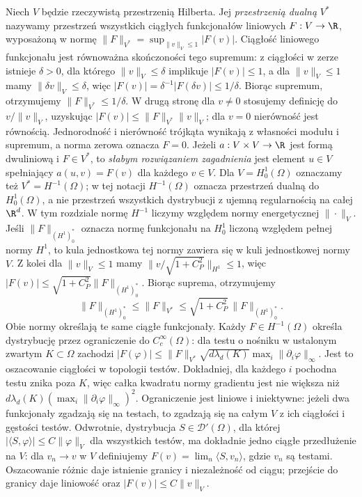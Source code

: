 \begin{definicja}
\label{def:pde11-dual}
Niech $V$ będzie rzeczywistą przestrzenią Hilberta.
Jej \emph{przestrzenią dualną} $V^*$ nazywamy przestrzeń wszystkich
ciągłych funkcjonałów liniowych $F:V\to\R$, wyposażoną w normę
$\|F\|_{V^*}=\sup_{\|v\|_V\le1}|F(v)|$.
Ciągłość liniowego funkcjonału jest równoważna skończoności
tego supremum: z ciągłości w zerze istnieje $\delta>0$,
dla którego $\|v\|_V\le\delta$ implikuje $|F(v)|\le1$,
a dla $\|v\|_V\le1$ mamy $\|\delta v\|_V\le\delta$,
więc $|F(v)|=\delta^{-1}|F(\delta v)|\le1/\delta$.
Biorąc supremum, otrzymujemy $\|F\|_{V^*}\le1/\delta$.
W drugą stronę dla $v\ne0$ stosujemy definicję do
$v/\|v\|_V$, uzyskując $|F(v)|\le\|F\|_{V^*}\|v\|_V$;
dla $v=0$ nierówność jest równością.
Jednorodność i nierówność trójkąta wynikają z własności
modułu i supremum, a norma zerowa oznacza $F=0$.
Jeżeli $a:V\times V\to\R$ jest formą dwuliniową i $F\in V^*$,
to \emph{słabym rozwiązaniem zagadnienia} jest element $u\in V$
spełniający $a(u,v)=F(v)$ dla każdego $v\in V$.
Dla $V=H_0^1(\Omega)$ oznaczamy też $V^*=H^{-1}(\Omega)$;
w tej notacji $H^{-1}(\Omega)$ oznacza przestrzeń dualną do
$H_0^1(\Omega)$, a nie przestrzeń wszystkich dystrybucji
z ujemną regularnością na całej $\R^d$.
W tym rozdziale normę $H^{-1}$ liczymy względem normy
energetycznej $\|\cdot\|_V$. Jeśli $\|F\|_{(H^1)^*_{0}}$
oznacza normę funkcjonału na $H_0^1$ liczoną względem
pełnej normy $H^1$, to kula jednostkowa tej normy
zawiera się w kuli jednostkowej normy $V$.
Z kolei dla $\|v\|_V\le1$ mamy
$\|v/\sqrt{1+C_P^2}\|_{H^1}\le1$, więc
$|F(v)|\le\sqrt{1+C_P^2}\|F\|_{(H^1)^*_{0}}$.
Biorąc suprema, otrzymujemy
\[
 \|F\|_{(H^1)^*_{0}}\le\|F\|_{V^*}
 \le\sqrt{1+C_P^2}\,\|F\|_{(H^1)^*_{0}}.
\]
Obie normy określają te same ciągłe funkcjonały.
Każdy $F\in H^{-1}(\Omega)$ określa dystrybucję przez
ograniczenie do $C_c^\infty(\Omega)$: dla testu o nośniku
w ustalonym zwartym $K\subset\Omega$ zachodzi
$|F(\varphi)|\le\|F\|_{V^*}\sqrt{d\lambda_d(K)}
\max_i\|\partial_i\varphi\|_\infty$.
Jest to oszacowanie ciągłości w topologii testów.
Dokładniej, dla każdego $i$ pochodna testu
znika poza $K$, więc całka kwadratu normy gradientu
jest nie większa niż $d\lambda_d(K)
(\max_i\|\partial_i\varphi\|_\infty)^2$.
Ograniczenie jest liniowe i iniektywne: jeżeli dwa
funkcjonały zgadzają się na testach, to zgadzają się
na całym $V$ z ich ciągłości i gęstości testów.
Odwrotnie, dystrybucja $S\in\mathcal D'(\Omega)$,
dla której $|\langle S,\varphi\rangle|\le C\|\varphi\|_V$
dla wszystkich testów, ma dokładnie jedno ciągłe
przedłużenie na $V$: dla $v_n\to v$ w $V$ definiujemy
$F(v)=\lim_n\langle S,v_n\rangle$, gdzie $v_n$ są testami.
Oszacowanie różnic daje istnienie granicy i niezależność
od ciągu; przejście do granicy daje liniowość oraz
$|F(v)|\le C\|v\|_V$.
\end{definicja}

